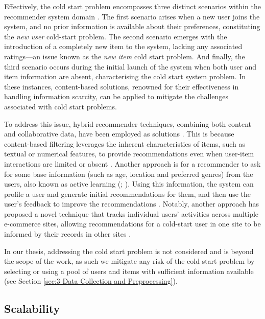 Effectively, the cold start problem encompasses three distinct scenarios within the recommender system domain \cite{lika2014facing}. The first scenario arises when a new user joins the system, and no prior information is available about their preferences, constituting the \textit{new user} cold-start problem. The second scenario emerges with the introduction of a completely new item to the system, lacking any associated ratings—an issue known as the \textit{new item} cold start problem. And finally, the third scenario occurs during the initial launch of the system when both user and item information are absent, characterising the cold start system problem. In these instances, content-based solutions, renowned for their effectiveness in handling information scarcity, can be applied to mitigate the challenges associated with cold start problems.

To address this issue, hybrid recommender techniques, combining both content and collaborative data, have been employed as solutions \cite{lika2014facing}. This is because content-based filtering leverages the inherent characteristics of items, such as textual or numerical features, to provide recommendations even when user-item interactions are limited or absent \cite{lika2014facing}. Another approach is for a recommender to ask for some base information (such as age, location and preferred genres) from the users, also known as active learning (\cite{burke2015robust}; \cite{zheng2010collaborative}). Using this information, the system can profile a user and generate initial recommendations for them, and then use the user's feedback to improve the recommendations \cite{zheng2010collaborative}. Notably, another approach has proposed a novel technique that tracks individual users' activities across multiple e-commerce sites, allowing recommendations for a cold-start user in one site to be informed by their records in other sites \cite{liu2014promoting}.

In our thesis, addressing the cold start problem is not considered and is beyond the scope of the work, as such we mitigate any risk of the cold start problem by selecting or using a pool of users and items with sufficient information available (see Section \ref{sec:3 Data Collection and Preprocessing}).

\subsection{Scalability}
\label{subsec:2 Scalability}


